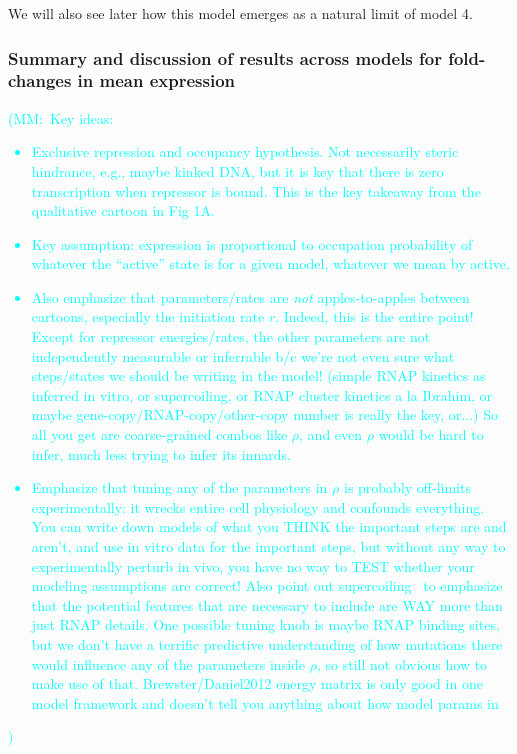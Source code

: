 \documentclass[12pt]{article}%
\newcommand{\mmnote}[1]{\textcolor{cyan}{(MM:~#1)}}
\begin{document}
We will also see later how this model emerges as a natural limit of model 4.

\subsubsection{Summary and discussion of results across models for fold-changes in mean expression}
\mmnote{Key ideas:
\begin{itemize}
\item Exclusive repression and occupancy hypothesis. Not
necessarily steric hindrance, e.g., maybe kinked DNA, but it is
key that there is zero transcription when repressor is bound.
This is the key takeaway from the qualitative cartoon in Fig 1A.
\item Key assumption: expression is proportional to occupation
probability of whatever the ``active'' state is for a given
model, whatever we mean by active.
\item Also emphasize that parameters/rates are \textit{not}
apples-to-apples between cartoons, especially the initiation rate $r$.
Indeed, this is the entire point! Except for repressor
energies/rates, the other parameters are not independently
measurable or inferrable b/c we're not even sure what
steps/states we should be writing in the model!
(simple RNAP kinetics as inferred in vitro, or supercoiling, or
RNAP cluster kinetics a la Ibrahim, or maybe
gene-copy/RNAP-copy/other-copy number is really the key, or...)
So all you get are coarse-grained combos like $\rho$, and even
$\rho$ would be hard to infer, much less trying to infer its innards.
\item Emphasize that tuning any of the parameters in $\rho$ is
probably off-limits experimentally: it wrecks entire cell
physiology and confounds everything. You can write down models of
what you THINK the important steps are and aren't, and use in
vitro data for the important steps, but without any way to
experimentally perturb in vivo, you have no way to TEST whether
your modeling assumptions are correct! Also point out
supercoiling~\cite{Chong2014,Sevier2016} to emphasize that the
potential features that are necessary to include are WAY more
than just RNAP details. One possible tuning knob is maybe RNAP
binding sites, but we don't have a terrific predictive
understanding of how mutations there would influence any of the
parameters inside $\rho$, so still not obvious how to make use of
that. Brewster/Daniel2012 energy matrix is only good in one model
framework and doesn't tell you anything about how model params in

\end{itemize}}
\end{document}
